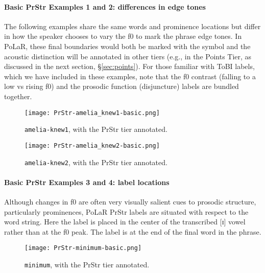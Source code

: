 \paragraph{Basic PrStr Examples 1 and 2: differences in edge tones}

The following examples share the same words and prominence locations but differ in how the speaker chooses to vary the f0 to mark the phrase edge tones. In PoLaR, these final boundaries would both be marked with the \textlabel{]} symbol and the acoustic distinction will be annotated in other tiers (e.g., in the Points Tier, as discussed in the next section, §\ref{sec:points}). For those familiar with ToBI labels, which we have included in these examples, note that the f0 contrast (falling to a low vs rising f0) and the prosodic function (disjuncture) labels are bundled together. 

\begin{figure}[H]
\centering
%
\texttt{[image: PrStr-amelia\_knew1-basic.png]}
%
\caption{\texttt{amelia-knew1}, with the PrStr tier annotated.%
\label{fig:amelia-knew1 PrStr}%
%
}
\end{figure}

\begin{figure}[H]
\centering
%
\texttt{[image: PrStr-amelia\_knew2-basic.png]}
%
\caption{\texttt{amelia-knew2}, with the PrStr tier annotated.%
\label{fig:amelia-knew2 PrStr}%
%
}
\end{figure}

\paragraph{Basic PrStr Examples  3 and 4: label locations}

Although changes in f0 are often very visually salient cues to prosodic structure, particularly prominences, PoLaR PrStr labels are situated with respect to the word string. Here the \textlabel{*} label is placed in the center of the transcribed [ɪ] vowel rather than at the f0 peak. The \textlabel{]} label is at the end of the final word in the phrase. 


\begin{figure}[H]
\centering
%
\texttt{[image: PrStr-minimum-basic.png]}
%
\caption{\texttt{minimum}, with the PrStr tier annotated.%
\label{fig:minimum PrStr}%
%
}
\end{figure}

